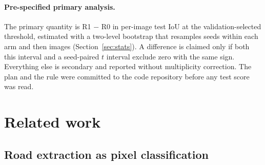 \documentclass[11pt]{article}
\begin{document}
\begin{table}[h]
\centering
\caption{The ablation ladder. All rungs use an ImageNet-pretrained ResNeXt-50 $32{\times}4$d encoder and the same U-Net decoder.}
\label{tab:ladder}
\end{table}

\paragraph{Pre-specified primary analysis.} The primary quantity is R1 $-$ R0 in per-image test
IoU at the validation-selected threshold, estimated with a two-level bootstrap that resamples
seeds within each arm and then images (Section~\ref{sec:stats}). A difference is claimed only if
both this interval and a seed-paired $t$ interval exclude zero with the same sign. Everything
else is secondary and reported without multiplicity correction. The plan and the rule were
committed to the code repository before any test score was read.

\section{Related work}
\label{sec:related}

\subsection{Road extraction as pixel classification}
\end{document}
